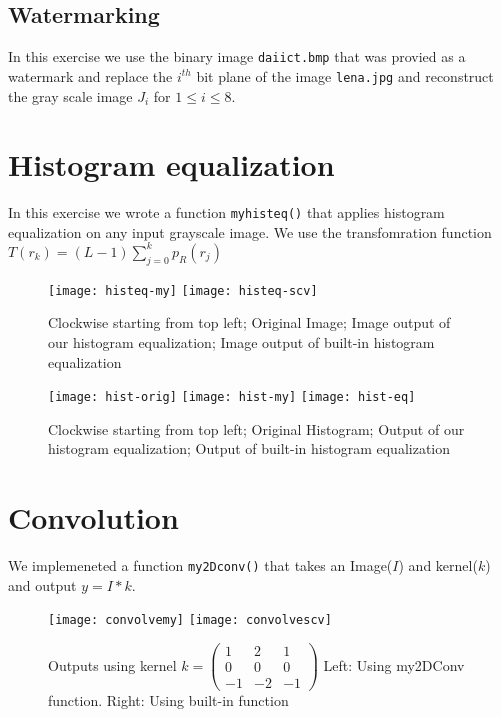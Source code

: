 \documentclass[paper=a4, fontsize=11pt]{scrartcl} %
\numberwithin{equation}{section} %
\numberwithin{figure}{section} %
\numberwithin{table}{section} %
\begin{document}

    \subsection{Watermarking}
    In this exercise we use the binary image \texttt{daiict.bmp} that was provied as a watermark and replace the \(i^{th}\) bit plane of the image \texttt{lena.jpg} and reconstruct the gray scale image \(J_i\) for \(1 \leq i \leq 8\).

\section{Histogram equalization}
    In this exercise we wrote a function \texttt{myhisteq()} that applies histogram equalization on any input grayscale image. 
    We use the transfomration function \\\(T(r_k) = (L-1)\sum_{j=0}^{k}p_R({r_j})\)

     \begin{figure}[h!]
        \centering
        \texttt{[image: histeq-my]}
        \texttt{[image: histeq-scv]}
        \caption{Clockwise starting from top left; Original Image; Image output of our histogram equalization; Image output of built-in histogram equalization}
    \end{figure}
    \begin{figure}[h!]
        \centering
        \texttt{[image: hist-orig]}
        \texttt{[image: hist-my]}
        \texttt{[image: hist-eq]}
        \caption{Clockwise starting from top left; Original Histogram; Output of our histogram equalization; Output of built-in histogram equalization}
    \end{figure}

\section{Convolution}
We implemeneted a function \texttt{my2Dconv()} that takes an Image(\(I\)) and kernel(\(k\)) and output \(y=I*k\).         
    \begin{figure}[h!]
        \centering
        \texttt{[image: convolvemy]}
        \texttt{[image: convolvescv]}
        \caption{Outputs using kernel \(k = \begin{pmatrix}
                                            1 & 2 & 1 \\
                                            0 & 0 & 0 \\
                                            -1 & -2 & -1
                                            \end{pmatrix}
                                        \)
            Left: Using my2DConv function.
            Right: Using built-in function
                }
    \end{figure}
\end{document}
